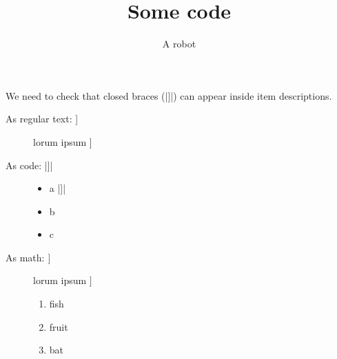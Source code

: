 \documentclass[oneside]{memoir}
\title{\sffamily Some code}
\author{\sffamily A robot}
\date{\sffamily }
\begin{document}
\frontmatter

\begin{titlingpage}
\maketitle
\end{titlingpage}

\tableofcontents


\cleardoublepage
We need to check that closed braces (\LeanVerb|]|) can appear inside item descriptions.


\begin{description}
\item[{As regular text: ]}] lorum ipsum ]

\item[{As code: \LeanVerb|]|}] \begin{itemize}
\item a \LeanVerb|]|

\item b

\item c


\end{itemize}


\item[{As math: $]$}] lorum ipsum $]$

\begin{enumerate}
\item fish

\item fruit

\item bat


\end{enumerate}



\end{description}




\mainmatter
\end{document}
